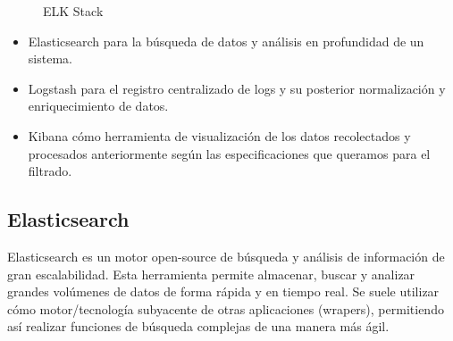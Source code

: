 \begin{figure}[H]
\caption{ELK Stack}
\end{figure}

\begin{itemize}
\item Elasticsearch para la búsqueda de datos y análisis en profundidad de un sistema.
\item Logstash para el registro centralizado de logs y su posterior normalización y enriquecimiento de datos.
\item Kibana cómo herramienta de visualización de los datos recolectados y procesados anteriormente según las especificaciones que queramos para el filtrado.
\end{itemize}

\subsection{Elasticsearch}
Elasticsearch es un motor open-source de búsqueda y análisis de información de gran escalabilidad. Esta herramienta permite almacenar, buscar y analizar grandes volúmenes de datos de forma rápida y en tiempo real. Se suele utilizar cómo motor/tecnología subyacente de otras aplicaciones (wrapers), permitiendo así realizar funciones de búsqueda complejas de una manera más ágil.\\

